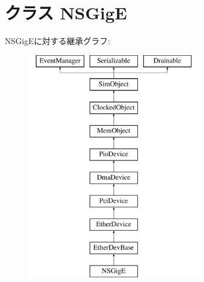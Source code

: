 \hypertarget{classEthernet_1_1NSGigE}{
\section{クラス NSGigE}
\label{classEthernet_1_1NSGigE}
}
NSGigEに対する継承グラフ:\begin{figure}[H]
\begin{center}
\leavevmode
\includegraphics[height=10cm]{classEthernet_1_1NSGigE}
\end{center}
\end{figure}

